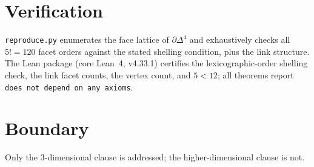 \documentclass[11pt]{article}
\begin{document}
\section{Verification}

\texttt{reproduce.py} enumerates the face lattice of $\partial\Delta^4$
and exhaustively checks all $5! = 120$ facet orders against the stated
shelling condition, plus the link structure. The Lean package (core
Lean~4, v4.33.1) certifies the lexicographic-order shelling check, the
link facet counts, the vertex count, and $5 < 12$; all theorems report
\texttt{does not depend on any axioms}.

\section{Boundary}

Only the 3-dimensional clause is addressed; the higher-dimensional
clause is not.
\end{document}
